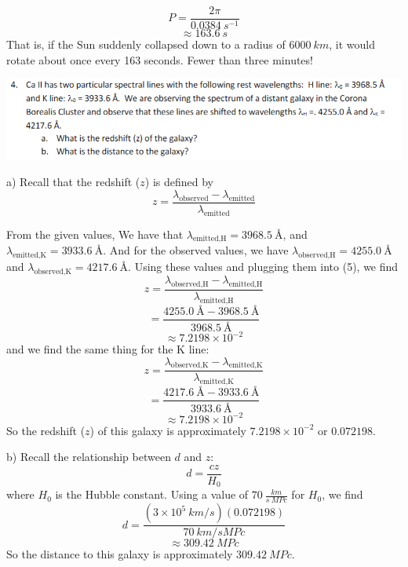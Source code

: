 \documentclass{article}
\begin{document}
\[P = \frac{2\pi}{0.0384 \:s^{-1}}\]
\[\approx 163.6 \:s\]
That is, if the Sun suddenly collapsed down to a radius of $6000 \:km$, it would rotate about once every 163 seconds. Fewer than three minutes!
\newline


\includegraphics[scale = 0.8]{problemset9prob4.PNG}
\newline

a) Recall that the redshift ($z$) is defined by
\begin{equation} 
z = \frac{\lambda_{\text{observed}} - \lambda_{\text{emitted}}}{\lambda_{\text{emitted}}} 
\end{equation}

From the given values, We have that $\lambda_{\text{emitted}, \text{H}} = 3968.5 \: \text{\AA}$, and $\lambda_{\text{emitted}, \text{K}} = 3933.6 \: \text{\AA}$. 
And for the observed values, we have $\lambda_{\text{observed},\text{H}} = 4255.0 \: \text{\AA}$ and $\lambda_{\text{observed},\text{K}} = 4217.6 \: \text{\AA}$. Using these values and plugging them into (5), we find 
\[z = \frac{\lambda_{\text{observed},\text{H}} - \lambda_{\text{emitted},\text{H}}}{\lambda_{\text{emitted},\text{H}}}\]
\[ = \frac{4255.0 \: \text{\AA} - 3968.5 \: \text{\AA}}{3968.5 \: \text{\AA}}\]
\[\approx 7.2198 \times 10^{-2}\]
and we find the same thing for the K line:
\[z = \frac{\lambda_{\text{observed}, \text{K}} - \lambda_{\text{emitted}, \text{K}}}{\lambda_{\text{emitted}, \text{K}}}\]
\[ = \frac{4217.6 \: \text{\AA} - 3933.6 \: \text{\AA}}{3933.6 \: \text{\AA}}\]
\[\approx 7.2198 \times 10^{-2}\]
So the redshift ($z$) of this galaxy is approximately $7.2198 \times 10^{-2}$ or $0.072198$.
\newline

b) Recall the relationship between $d$ and $z$:
\[d = \frac{cz}{H_0}\]
where $H_0$ is the Hubble constant. Using a value of $70 \: \frac{km}{s \:MPc}$ for $H_0$, we find
\[d = \frac{(3 \times 10^5 \: km/s)(0.072198)}{70 \: km/sMPc}\]
\[\approx 309.42 \:MPc\]
So the distance to this galaxy is approximately $309.42 \:MPc$.
\end{document}
